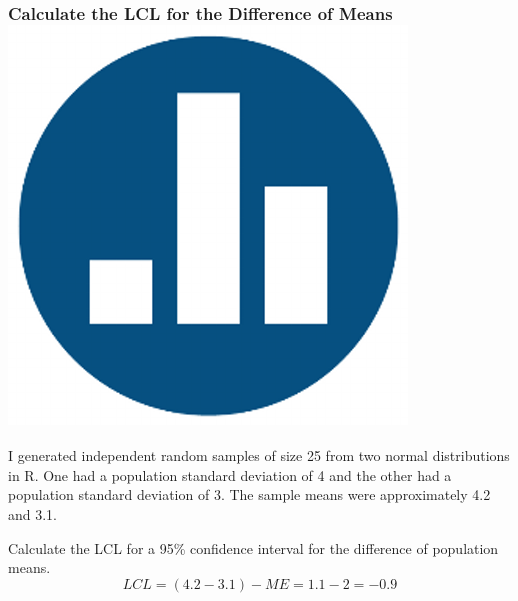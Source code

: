 \documentclass[handout]{beamer}
\begin{document}
\begin{frame}
\frametitle{Calculate the LCL for the Difference of Means \hfill \includegraphics[scale = 0.05]{./images/clicker}}
I generated independent random samples of size 25 from two normal distributions in R. One had a population standard deviation of 4 and the other had a population standard deviation of 3. The sample means were approximately 4.2 and 3.1.

\vspace{1em}
\alert{Calculate the LCL for a 95\% confidence interval for the difference of population means.}
\pause
$$LCL = (4.2 - 3.1) - ME = 1.1 - 2 = -0.9$$
\end{frame}
\end{document}
